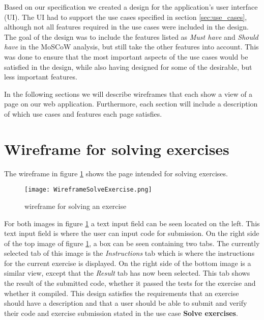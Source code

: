 Based on our specification we created a design for the application's user interface (UI). The UI had to support the use cases specified in section \ref*{sec:use_cases}, although not all features required in the use cases were included in the design. The goal of the design was to include the features listed as \textit{Must have} and \textit{Should have} in the MoSCoW analysis, but still take the other features into account. This was done to ensure that the most important aspects of the use cases would be satisfied in the design, while also having designed for some of the desirable, but less important features.

In the following sections we will describe wireframes that each show a view of a page on our web application. Furthermore, each section will include a description of which use cases and features each page satisfies. 

\section{Wireframe for solving exercises}
The wireframe in figure \ref{fig:wfExercise} shows the page intended for solving exercises.
\begin{figure}[H]
	\texttt{[image: WireframeSolveExercise.png]}
	\centering
	\caption{wireframe for solving an exercise}
	\label{fig:wfExercise}
\end{figure}

For both images in figure \ref{fig:wfExercise} a text input field can be seen located on the left. This text input field is where the user can input code for submission. On the right side of the top image of figure \ref{fig:wfExercise}, a box can be seen containing two tabs. The currently selected tab of this image is the \textit{Instructions} tab which is where the instructions for the current exercise is displayed. On the right side of the bottom image is a similar view, except that the \textit{Result} tab has now been selected. This tab shows the result of the submitted code, whether it passed the tests for the exercise and whether it compiled. This design satisfies the requirements that an exercise should have a description and that a user should be able to submit and verify their code and exercise submission stated in the use case \textbf{Solve exercises}.

